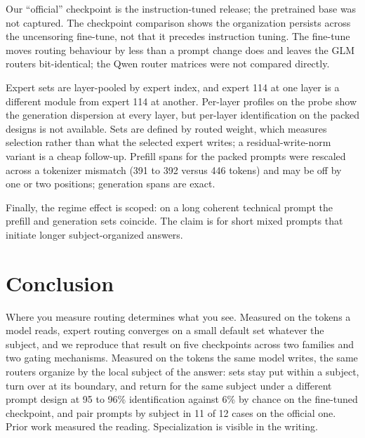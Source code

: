 \documentclass[10pt,twocolumn]{article}
\begin{document}
Our ``official'' checkpoint is the instruction-tuned release; the pretrained base was not captured. The checkpoint comparison shows the organization persists across the uncensoring fine-tune, not that it precedes instruction tuning. The fine-tune moves routing behaviour by less than a prompt change does and leaves the GLM routers bit-identical; the Qwen router matrices were not compared directly.

Expert sets are layer-pooled by expert index, and expert 114 at one layer is a different module from expert 114 at another. Per-layer profiles on the probe show the generation dispersion at every layer, but per-layer identification on the packed designs is not available. Sets are defined by routed weight, which measures selection rather than what the selected expert writes; a residual-write-norm variant is a cheap follow-up. Prefill spans for the packed prompts were rescaled across a tokenizer mismatch (391 to 392 versus 446 tokens) and may be off by one or two positions; generation spans are exact.

Finally, the regime effect is scoped: on a long coherent technical prompt the prefill and generation sets coincide. The claim is for short mixed prompts that initiate longer subject-organized answers.

\section{Conclusion}
\label{sec:conc}

Where you measure routing determines what you see. Measured on the tokens a model reads, expert routing converges on a small default set whatever the subject, and we reproduce that result on five checkpoints across two families and two gating mechanisms. Measured on the tokens the same model writes, the same routers organize by the local subject of the answer: sets stay put within a subject, turn over at its boundary, and return for the same subject under a different prompt design at 95 to 96\% identification against 6\% by chance on the fine-tuned checkpoint, and pair prompts by subject in 11 of 12 cases on the official one. Prior work measured the reading. Specialization is visible in the writing.
\end{document}
